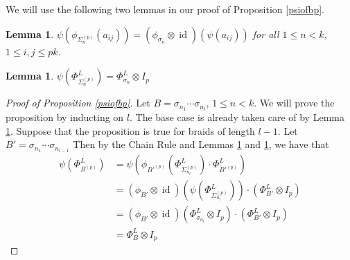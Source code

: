 \documentclass[11pt]{amsart}
\def\s{{\sigma}}
\newcommand\id{\operatorname{id}}
\newcommand\Sp{\Sigma^{(p)}}
\newtheorem{lem}[thm]{Lemma}
\newtheorem{prop}[thm]{Proposition}
\begin{document}
%	





\noindent We will use the following two lemmas in our proof of Proposition \ref{psiofbp}.



\begin{lem}\label{commutes}
$\psi(\phi_{\Sp_n}(a_{ij})) = (\phi_{\s_n} \otimes \id)(\psi(a_{ij}))$ for all $1\le n < k$, $1 \le i,j \le pk$.
\end{lem}

\begin{lem}\label{basecase}
$\psi\left(\Phi_{\Sp_n}^L\right) = \Phi_{\s_n}^L\otimes I_p$
\end{lem}



\begin{proof} [Proof of Proposition \ref{psiofbp}]
Let $B = \s_{n_1}\cdots\s_{n_l}$, $1\le n<k$.  We will prove the proposition by inducting on $l$.  The base case is already taken care of by Lemma \ref{basecase}.  Suppose that the proposition is true for braids of length $l-1$.  Let $B' =\s_{n_1}\cdots\s_{n_{l-1}}$ Then by the Chain Rule and Lemmas \ref{commutes} and \ref{basecase}, we have that
\begin{align*}
\psi\left(\Phi_{B^{(p)}}^L\right) &= \psi\left(\phi_{B'^{(p)}}\left(\Phi_{\Sp_{n_l}}^L\right)\cdot\Phi_{B'^{(p)}}^L\right)\\
&= \left(\phi_{B'}\otimes\id\right)\left(\psi\left(\Phi_{\Sp_{n_l}}^L\right)\right)\cdot \left(\Phi_{B'}^L\otimes I_p\right)\\
&= \left(\phi_{B'}\otimes\id\right)\left(\Phi_{\s_{n_l}}^L\otimes I_p\right)\cdot \left(\Phi_{B'}^L\otimes I_p\right)\\
&= \Phi_B^L\otimes I_p
\end{align*}
\end{proof}
\end{document}
